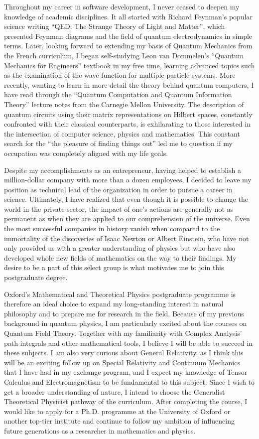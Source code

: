 \documentclass[10pt]{article}
\begin{document}
Throughout my career in software development, I never ceased to deepen my knowledge of academic disciplines. It all started with Richard Feynman's popular science writing ``QED: The Strange Theory of Light and Matter'', which presented Feynman diagrams and the field of quantum electrodynamics in simple terms. Later, looking forward to extending my basis of Quantum Mechanics from the French curriculum, I began self-studying Leon van Dommelen's ``Quantum Mechanics for Engineers'' textbook in my free time, learning advanced topics such as the examination of the wave function for multiple-particle systems. More recently, wanting to learn in more detail the theory behind quantum computers, I have read through the ``Quantum Computation and Quantum Information Theory'' lecture notes from the Carnegie Mellon University. The description of quantum circuits using their matrix representations on Hilbert spaces, constantly confronted with their classical counterparts, is exhilarating to those interested in the intersection of computer science, physics and mathematics. This constant search for the ``the pleasure of finding things out'' led me to question if my occupation was completely aligned with my life goals.

Despite my accomplishments as an entrepreneur, having helped to establish a million-dollar company with more than a dozen employees, I decided to leave my position as technical lead of the organization in order to pursue a career in science. Ultimately, I have realized that even though it is possible to change the world in the private sector, the impact of one's actions are generally not as permanent as when they are applied to our comprehension of the universe. Even the most successful companies in history vanish when compared to the immortality of the discoveries of Isaac Newton or Albert Einstein, who have not only provided us with a greater understanding of physics but who have also developed whole new fields of mathematics on the way to their findings. My desire to be a part of this select group is what motivates me to join this postgraduate degree.

Oxford's Mathematical and Theoretical Physics postgraduate programme is therefore an ideal choice to expand my long-standing interest in natural philosophy and to prepare me for research in the field. Because of my previous background in quantum physics, I am particularly excited about the courses on Quantum Field Theory. Together with my familiarity with Complex Analysis' path integrals and other mathematical tools, I believe I will be able to succeed in these subjects. I am also very curious about General Relativity, as I think this will be an exciting follow up on Special Relativity and Continuum Mechanics that I have had in my exchange program, and I expect my knowledge of Tensor Calculus and Electromagnetism to be fundamental to this subject. Since I wish to get a broader understanding of nature, I intend to choose the Generalist Theoretical Physicist pathway of the curriculum. After completing the course, I would like to apply for a Ph.D. programme at the University of Oxford or another top-tier institute and continue to follow my ambition of influencing future generations as a researcher in mathematics and physics.
\end{document}
